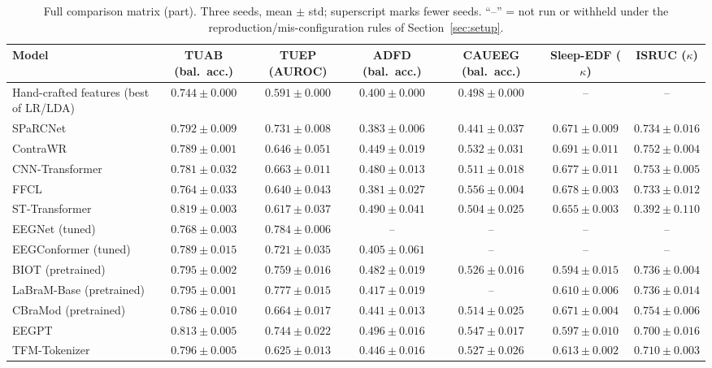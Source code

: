 \begin{table}[h]
\centering
\scriptsize
\caption{Full comparison matrix (part). Three seeds, mean $\pm$ std; superscript marks fewer seeds. ``--'' = not run or withheld under the reproduction/mis-configuration rules of Section~\ref{sec:setup}.}
\begin{tabular}{lcccccc}
\toprule
Model & TUAB (bal.\ acc.) & TUEP (AUROC) & ADFD (bal.\ acc.) & CAUEEG (bal.\ acc.) & Sleep-EDF ($\kappa$) & ISRUC ($\kappa$) \\
\midrule
Hand-crafted features (best of LR/LDA) & $0.744 \pm 0.000$ & $0.591 \pm 0.000$ & $0.400 \pm 0.000$ & $0.498 \pm 0.000$ & -- & -- \\
SPaRCNet & $0.792 \pm 0.009$ & $0.731 \pm 0.008$ & $0.383 \pm 0.006$ & $0.441 \pm 0.037$ & $0.671 \pm 0.009$ & $0.734 \pm 0.016$ \\
ContraWR & $0.789 \pm 0.001$ & $0.646 \pm 0.051$ & $0.449 \pm 0.019$ & $0.532 \pm 0.031$ & $0.691 \pm 0.011$ & $0.752 \pm 0.004$ \\
CNN-Transformer & $0.781 \pm 0.032$ & $0.663 \pm 0.011$ & $0.480 \pm 0.013$ & $0.511 \pm 0.018$ & $0.677 \pm 0.011$ & $0.753 \pm 0.005$ \\
FFCL & $0.764 \pm 0.033$ & $0.640 \pm 0.043$ & $0.381 \pm 0.027$ & $0.556 \pm 0.004$ & $0.678 \pm 0.003$ & $0.733 \pm 0.012$ \\
ST-Transformer & $0.819 \pm 0.003$ & $0.617 \pm 0.037$ & $0.490 \pm 0.041$ & $0.504 \pm 0.025$ & $0.655 \pm 0.003$ & $0.392 \pm 0.110$ \\
EEGNet (tuned) & $0.768 \pm 0.003$ & $0.784 \pm 0.006$ & -- & -- & -- & -- \\
EEGConformer (tuned) & $0.789 \pm 0.015$ & $0.721 \pm 0.035$ & $0.405 \pm 0.061$ & -- & -- & -- \\
BIOT (pretrained) & $0.795 \pm 0.002$ & $0.759 \pm 0.016$ & $0.482 \pm 0.019$ & $0.526 \pm 0.016$ & $0.594 \pm 0.015$ & $0.736 \pm 0.004$ \\
LaBraM-Base (pretrained) & $0.795 \pm 0.001$ & $0.777 \pm 0.015$ & $0.417 \pm 0.019$ & -- & $0.610 \pm 0.006$ & $0.736 \pm 0.014$ \\
CBraMod (pretrained) & $0.786 \pm 0.010$ & $0.664 \pm 0.017$ & $0.441 \pm 0.013$ & $0.514 \pm 0.025$ & $0.671 \pm 0.004$ & $0.754 \pm 0.006$ \\
EEGPT & $0.813 \pm 0.005$ & $0.744 \pm 0.022$ & $0.496 \pm 0.016$ & $0.547 \pm 0.017$ & $0.597 \pm 0.010$ & $0.700 \pm 0.016$ \\
TFM-Tokenizer & $0.796 \pm 0.005$ & $0.625 \pm 0.013$ & $0.446 \pm 0.016$ & $0.527 \pm 0.026$ & $0.613 \pm 0.002$ & $0.710 \pm 0.003$ \\

\end{tabular}
\end{table}
